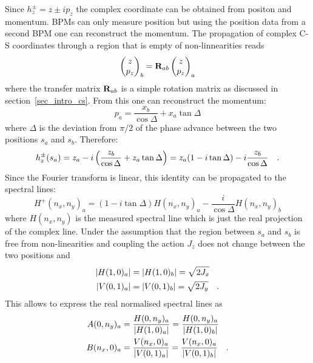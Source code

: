 Since $h_z^\pm = z \pm ip_z$ the complex coordinate can be obtained from positon and momentum.
BPMs can only measure position but using the position data from a second BPM one can reconstruct the momentum.
The propagation of complex C-S coordinates through a region that is empty of non-linnearities reads
%
\begin{equation}
    \begin{pmatrix}
        z\\p_z
    \end{pmatrix}_b = \mathbf{R}_{ab} 
    \begin{pmatrix}
        z\\p_z
    \end{pmatrix}_a
\end{equation}
%
where the transfer matrix $\mathbf{R}_{ab}$ is a simple rotation matrix as discussed in section~\ref{sec_intro_cs}.
From this one can reconstruct the momentum:
%
\begin{equation}
    p_a = \frac{x_b}{\cos\Delta} + x_a \tan\Delta
\end{equation}
%
where $\Delta$ is the deviation from $\pi/2$ of the phase advance between the two positions $s_a$ and $s_b$.
Therefore:
%
\begin{equation}
    h_z^\pm(s_a) = z_a - i \left(\frac{z_b}{\cos\Delta} + z_a\tan\Delta \right) = z_a(1-i\tan\Delta) - i \frac{z_b}{\cos\Delta}
    \quad .
\end{equation}
%
Since the Fourier transform is linear, this identity can be propagated to the spectral lines:
%
\begin{equation}
    H^+(n_x,n_y)_a = (1-i\tan\Delta)H(n_x,n_y)_a - \frac{i}{\cos\Delta}H(n_x,n_y)_b
    \label{eq_reconstr_cplx}
\end{equation}
where $H(n_x,n_y)$ is the measured spectral line which is just the real projection of the complex line. 
%
Under the assumption that the region between $s_a$ and $s_b$ is free from non-li\-nea\-ri\-ties and coupling
the action $J_z$ does not change between the two positions and
%
\begin{align}
    |H(1,0)_a| &= |H(1,0)_b| = \sqrt{2J_x} \notag\\
    |V(0,1)_a| &= |V(0,1)_b| = \sqrt{2J_y}
    \quad .
\end{align}
%
This allows to express the real normalised spectral lines as
%
\begin{align}
    A(0,n_y)_a &= \frac{H(0,n_y)_a}{\left| H(1,0)_a \right|} = \frac{H(0,n_y)_a}{\left| H(1,0)_b \right|} \notag \\
    B(n_x,0)_a &= \frac{V(n_x,0)_a}{\left| V(0,1)_a \right|} = \frac{V(n_x,0)_a}{\left| V(0,1)_b \right|} 
    \quad .
\end{align}
